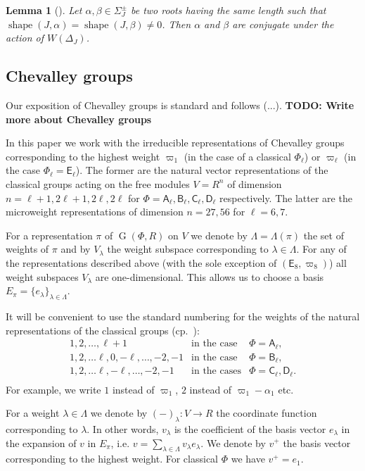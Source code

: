 \documentclass[12pt]{amsart}
\numberwithin{equation}{section}
\newtheorem{lemma}[lemmacounter]{Lemma}
\theoremstyle{definition}
\DeclareMathOperator{\G}{G}
\DeclareMathOperator{\shape}{shape}
\newcommand{\rA}{\mathsf{A}}
\newcommand{\rB}{\mathsf{B}}
\newcommand{\rC}{\mathsf{C}}
\newcommand{\rD}{\mathsf{D}}
\newcommand{\rE}{\mathsf{E}}
\begin{document}
\begin{lemma}[{\cite[Lemma~1]{ABS}}]\label{lemma:abs}
Let $\alpha, \beta \in \Sigma^\pm_J$ be two roots having the same length such that $\shape(J,\alpha)=\shape(J,\beta)\neq 0$.
Then $\alpha$ and $\beta$ are conjugate under the action of $W(\Delta_J)$.
\end{lemma}

\subsection{Chevalley groups}
Our exposition of Chevalley groups is standard and follows (...).
\textbf{TODO: Write more about Chevalley groups}

In this paper we work with the irreducible representations of Chevalley groups corresponding to the highest weight
$\varpi_1$ (in the case of a classical $\Phi_\ell$) or $\varpi_\ell$ (in the case $\Phi_\ell=\rE_\ell$). 
The former are the natural vector representations of the classical groups acting on the free modules $V=R^n$ of dimension 
$n=\ell+1, 2\ell+1, 2\ell,2\ell$ for $\Phi=\rA_\ell,\rB_\ell,\rC_\ell,\rD_\ell$ respectively.
The latter are the microweight representations of dimension $n=27, 56$ for $\ell=6,7$.

For a representation $\pi$ of $\G(\Phi, R)$ on $V$ we denote by $\Lambda=\Lambda(\pi)$ the set of weights of $\pi$ and by $V_\lambda$ the weight subspace corresponding to $\lambda\in\Lambda$.
For any of the representations described above (with the sole exception of $(\rE_8, \varpi_8)$) all weight subspaces $V_\lambda$ are one-dimensional. 
This allows us to choose a basis $E_\pi=\{e_\lambda\}_{\lambda\in\Lambda}$.

It will be convenient to use the standard numbering for the weights of the natural representations of the classical groups (cp.~\cite[§1B]{St78}):
\[\begin{array}{cll}
  1,2,\ldots, \ell+1 & \text{in the case} & \Phi =\rA_\ell, \\
  1,2,\ldots \ell, 0, -\ell,\ldots, -2, -1 & \text{in the case} & \Phi =\rB_\ell, \\
  1,2,\ldots \ell, -\ell,\ldots, -2, -1 & \text{in the cases}   & \Phi =\rC_\ell, \rD_\ell. \\
\end{array}\]
For example, we write $1$ instead of $\varpi_1$, $2$ instead of $\varpi_1-\alpha_1$ etc.

For a weight $\lambda\in \Lambda$ we denote by $(-)_\lambda\colon V\to R$ the coordinate function corresponding to $\lambda$.
In other words,  $v_\lambda$ is the coefficient of the basis vector $e_\lambda$ in the expansion of $v$ in $E_\pi$, i.e. $v=\sum_{\lambda\in \Lambda} v_\lambda e_\lambda$.
We denote by $v^+$ the basis vector corresponding to the highest weight.
For classical $\Phi$ we have $v^+=e_1$.
\end{document}
